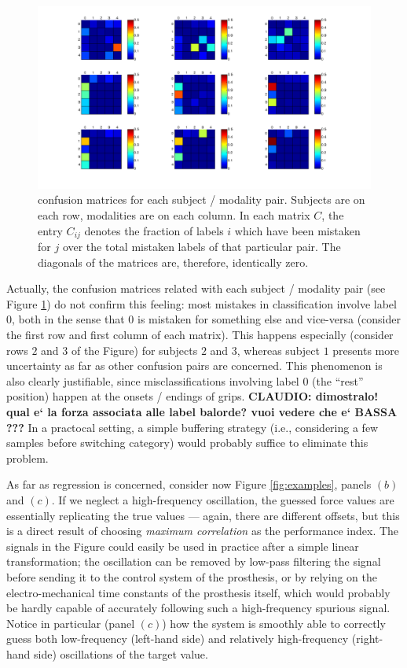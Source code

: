 \begin{figure}[!ht] \centering
  \includegraphics[width=\textwidth]{figs/confusion}
  \caption{confusion matrices for each subject / modality
    pair. Subjects are on each row, modalities are on each column. In
    each matrix $C$, the entry $C_{ij}$ denotes the fraction of labels
    $i$ which have been mistaken for $j$ over the total mistaken
    labels of that particular pair. The diagonals of the matrices are,
    therefore, identically zero.}
  \label{fig:confusion}
\end{figure}

Actually, the confusion matrices related with each subject / modality
pair (see Figure \ref{fig:confusion}) do not confirm this feeling:
most mistakes in classification involve label $0$, both in the sense
that $0$ is mistaken for something else and vice-versa (consider the
first row and first column of each matrix). This happens especially
(consider rows $2$ and $3$ of the Figure) for subjects $2$ and $3$,
whereas subject $1$ presents more uncertainty as far as other
confusion pairs are concerned. This phenomenon is also clearly
justifiable, since misclassifications involving label $0$ (the
``rest'' position) happen at the onsets / endings of
grips. \textbf{CLAUDIO: dimostralo! qual e` la forza associata alle
label balorde? vuoi vedere che e` BASSA ???} In a practocal setting, a
simple buffering strategy (i.e., considering a few samples before
switching category) would probably suffice to eliminate this problem.

As far as regression is concerned, consider now Figure
\ref{fig:examples}, panels $(b)$ and $(c)$. If we neglect a
high-frequency oscillation, the guessed force values are essentially
replicating the true values --- again, there are different offsets,
but this is a direct result of choosing \emph{maximum correlation} as
the performance index. The signals in the Figure could easily be used
in practice after a simple linear transformation; the oscillation can
be removed by low-pass filtering the signal before sending it to the
control system of the prosthesis, or by relying on the
electro-mechanical time constants of the prosthesis itself, which
would probably be hardly capable of accurately following such a
high-frequency spurious signal. Notice in particular (panel $(c)$) how
the system is smoothly able to correctly guess both low-frequency
(left-hand side) and relatively high-frequency (right-hand side)
oscillations of the target value.

